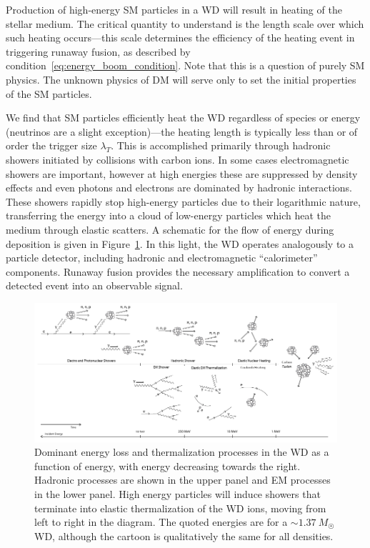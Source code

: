 Production of high-energy SM particles in a WD will result in heating of the stellar medium.
The critical quantity to understand is the length scale over which such heating occurs---this scale determines the efficiency of the heating event in triggering runaway fusion, as described by condition~\eqref{eq:energy_boom_condition}.
Note that this is a question of purely SM physics.
The unknown physics of DM will serve only to set the initial properties of the SM particles.

We find that SM particles efficiently heat the WD regardless of species or energy (neutrinos are a slight exception)---the heating length is typically less than or of order the trigger size $\lambda_T$.
This is accomplished primarily through hadronic showers initiated by collisions with carbon ions.
In some cases electromagnetic showers are important, however at high energies these are suppressed by density effects and even photons and electrons are dominated by hadronic interactions.
These showers rapidly stop high-energy particles due to their logarithmic nature, transferring the energy into a cloud of low-energy particles which heat the medium through elastic scatters.
A schematic for the flow of energy during deposition is given in Figure~\ref{fig:cooling-cartoon}.
In this light, the WD operates analogously to a particle detector, including hadronic and electromagnetic ``calorimeter'' components.
Runaway fusion provides the necessary amplification to convert a detected event into an observable signal.

\begin{figure}
\includegraphics[scale=1.15]{cooling-cartoon.pdf}
\caption{Dominant energy loss and thermalization processes in the WD as a function of energy, with energy decreasing towards the right.
Hadronic processes are shown in the upper panel and EM processes in the lower panel.
High energy particles will induce showers that terminate into elastic thermalization of the WD ions, moving from left to right in the diagram.
The quoted energies are for a $\sim 1.37 ~M_{\astrosun}$ WD, although the cartoon is qualitatively the same for all densities.}
\label{fig:cooling-cartoon}
\end{figure}


